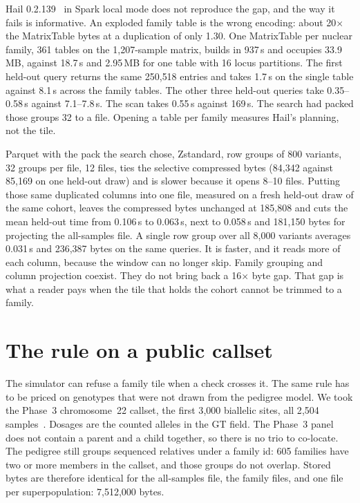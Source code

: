 \documentclass[11pt]{article}
\begin{document}
Hail 0.2.139~\cite{hail} in Spark local mode does not reproduce the gap, and the way it fails is informative.
An exploded family table is the wrong encoding: about 20$\times$ the MatrixTable bytes at a duplication of only 1.30.
One MatrixTable per nuclear family, 361 tables on the 1{,}207-sample matrix, builds in 937\,s and occupies 33.9\,MB, against 18.7\,s and 2.95\,MB for one table with 16 locus partitions.
The first held-out query returns the same 250{,}518 entries and takes 1.7\,s on the single table against 8.1\,s across the family tables.
The other three held-out queries take 0.35--0.58\,s against 7.1--7.8\,s.
The scan takes 0.55\,s against 169\,s.
The search had packed those groups 32 to a file.
Opening a table per family measures Hail's planning, not the tile.

Parquet with the pack the search chose, Zstandard, row groups of 800 variants, 32 groups per file, 12 files, ties the selective compressed bytes (84{,}342 against 85{,}169 on one held-out draw) and is slower because it opens 8--10 files.
Putting those same duplicated columns into one file, measured on a fresh held-out draw of the same cohort, leaves the compressed bytes unchanged at 185{,}808 and cuts the mean held-out time from 0.106\,s to 0.063\,s, next to 0.058\,s and 181{,}150 bytes for projecting the all-samples file.
A single row group over all 8{,}000 variants averages 0.031\,s and 236{,}387 bytes on the same queries.
It is faster, and it reads more of each column, because the window can no longer skip.
Family grouping and column projection coexist.
They do not bring back a 16$\times$ byte gap.
That gap is what a reader pays when the tile that holds the cohort cannot be trimmed to a family.

\section{The rule on a public callset}
\label{sec:rule}

The simulator can refuse a family tile when a check crosses it.
The same rule has to be priced on genotypes that were not drawn from the pedigree model.
We took the Phase~3 chromosome~22 callset, the first 3{,}000 biallelic sites, all 2{,}504 samples~\cite{genomes2015}.
Dosages are the counted alleles in the GT field.
The Phase~3 panel does not contain a parent and a child together, so there is no trio to co-locate.
The pedigree still groups sequenced relatives under a family id: 605 families have two or more members in the callset, and those groups do not overlap.
Stored bytes are therefore identical for the all-samples file, the family files, and one file per superpopulation: 7{,}512{,}000 bytes.
\end{document}
